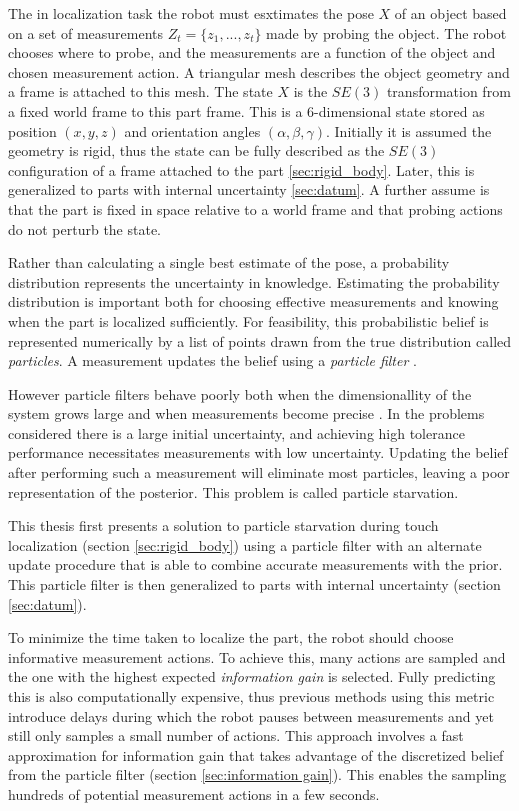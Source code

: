 \documentclass[../thesis.tex]{subfiles}
\begin{document}
The in localization task the robot must esxtimates the pose $X$ of an object based on a set of measurements $Z_t = \{z_1, ..., z_t\}$ made by probing the object.
The robot chooses where to probe, and the measurements are a function of the object and chosen measurement action.
A triangular mesh describes the object geometry and a frame is attached to this mesh. 
The state $X$ is the $SE(3)$ transformation from a fixed world frame to this part frame. 
This is a 6-dimensional state stored as position $(x,y,z)$ and orientation angles $(\alpha, \beta, \gamma)$. 
Initially it is assumed the geometry is rigid, thus the state can be fully described as the $SE(3)$ configuration of a frame attached to the part \ref{sec:rigid_body}.
Later, this is generalized to parts with internal uncertainty \ref{sec:datum}.
A further assume is that the part is fixed in space relative to a world frame and that probing actions do not perturb the state. 

Rather than calculating a single best estimate of the pose, a probability distribution represents the uncertainty in knowledge.
Estimating the probability distribution is important both for choosing effective measurements and knowing when the part is localized sufficiently. 
For feasibility, this probabilistic belief is represented numerically by a list of points drawn from the true distribution called \textit{particles}. 
A measurement updates the belief using a \textit{particle filter} \cite{Thrun2000a}.

However particle filters behave poorly both when the dimensionallity of the system grows large and when measurements become precise \cite{Koval2013}. 
In the problems considered there is a large initial uncertainty, and achieving high tolerance performance necessitates measurements with low uncertainty.
Updating the belief after performing such a measurement will eliminate most particles, leaving a poor representation of the posterior. This problem is called particle starvation.

This thesis first presents a solution to particle starvation during touch localization (section \ref{sec:rigid_body}) using a particle filter with an alternate update procedure that is able to combine accurate measurements with the prior. 
This particle filter is then generalized to parts with internal uncertainty (section \ref{sec:datum}).

To minimize the time taken to localize the part, the robot should choose informative measurement actions.
To achieve this, many actions are sampled and the one with the highest expected \textit{information gain} is selected. 
Fully predicting this is also computationally expensive, thus previous methods using this metric introduce delays during which the robot pauses between measurements and yet still only samples a small number of actions.
This approach involves a fast approximation for information gain that takes advantage of the discretized belief from the particle filter (section \ref{sec:information gain}). 
This enables the sampling hundreds of potential measurement actions in a few seconds. 
\end{document}
